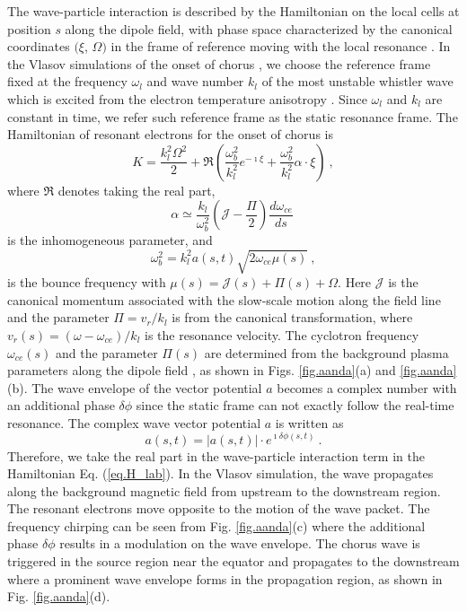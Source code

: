 The wave-particle interaction is described by the Hamiltonian on the local cells 
at position $s$ along the dipole field, with phase space characterized by the canonical coordinates $(\xi$, $\Omega)$ in the frame of reference moving with the local resonance
\cite{zheng2024}.
In the Vlasov simulations of  the onset of chorus
\cite{zheng2024,zheng2023b}, we choose the reference frame fixed at the frequency  $\omega_l$ and wave number $k_l$  of the most unstable whistler wave which is excited from the electron temperature anisotropy \cite{gary_1993}. 
Since $\omega_l$ and $k_l$ are constant in time, we refer such reference frame as the static resonance frame. 
The Hamiltonian of resonant electrons  for the onset of chorus is 
\cite{zheng2024}
\begin{equation}\label{eq.H_lab}
    K = \frac{k_l^2\Omega^2}{2} + {\Re}\left(\frac{\omega_b^2}{k_l^2} e^{-\imath \xi} + \frac{\omega_b^2}{k_l^2}\alpha \cdot \xi \right)~,
\end{equation}
where ${\Re}$ denotes taking the real part, 
\begin{equation}\label{eq.alpold}
   \alpha  \simeq \frac{k_l}{\omega_{b}^2}(\mathcal{J} - \frac{\Pi}{2}) \frac{d\omega_{ce}}{ds}~
\end{equation}
is the inhomogeneous parameter,
and 
\begin{equation}
    {\omega_b^2} = k_l^2 a(s,t) \sqrt{2\omega_{ce}\mu(s)}~,
\end{equation}
is the bounce frequency 
with $\mu(s) = \mathcal{J}(s)+\Pi(s)+\Omega$.
Here $\mathcal{J}$ is the canonical momentum associated with the slow-scale motion along the field line
and the parameter $\Pi = v_r/k_l$ is 
from the canonical transformation, 
where  $v_r(s)=(\omega - \omega_{ce})/k_l$ is the resonance velocity. The cyclotron frequency $\omega_{ce}(s)$ 
and 
the parameter $\Pi(s)$
are determined from the background plasma parameters along the dipole field \cite{zheng2024,zheng2023b}, 
as shown in Figs. \ref{fig.aanda}(a) and \ref{fig.aanda}(b).
The  wave envelope of the vector potential $a$ becomes a complex number with an additional phase $\delta \phi$ since the static frame can not exactly follow the real-time resonance. 
The complex wave vector potential $a$ is written as 
\begin{equation}
    a(s,t) = |a(s,t)| \cdot e^{\imath \delta \phi(s,t)}~.
\end{equation}
Therefore, we take the real part in the wave-particle interaction term in the  Hamiltonian Eq. (\ref{eq.H_lab}).
In the Vlasov simulation,
 the wave propagates along the background magnetic field from upstream to the downstream region.
The resonant electrons 
move opposite to the motion of the wave packet.  
The frequency chirping can be seen from Fig. \ref{fig.aanda}(c) where the additional phase $\delta \phi$ results in a modulation on the wave envelope.
The chorus wave is triggered in the source region near the equator and propagates to the downstream where a prominent wave envelope forms in the propagation region, as shown in Fig. \ref{fig.aanda}(d).

